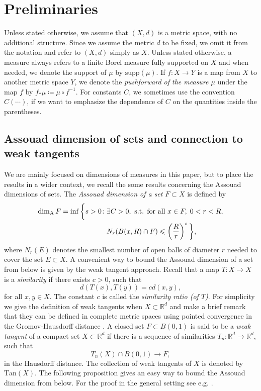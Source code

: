 \documentclass{PRM}
\newcommand{\field}[1]{\mathbb{#1}}
\newcommand{\R}{\field{R}}
\newcommand{\adim}{\dim_{\mathrm{A}}}
\theoremstyle{plain}
\theoremstyle{definition}
\theoremstyle{remark}
\begin{document}
\section{Preliminaries}\label{sec:prelim}
Unless stated otherwise, we assume that $(X,d)$ is a metric space, with no additional structure. Since we assume the metric $d$ to be fixed, we omit it from the notation and refer to $(X,d)$ simply as $X$. Unless stated otherwise, a measure always refers to a finite Borel measure fully supported on $X$ and when needed, we denote the support of $\mu$ by $\mathrm{supp}(\mu)$. If $f:X\to Y$ is a map from $X$ to another metric space $Y$, we denote the \emph{pushforward of the measure $\mu$} under the map $f$ by $f_*\mu\coloneqq\mu\circ f^{-1}$.  For constants $C$, we sometimes use the convention $C(\cdots)$, if we want to emphasize the dependence of $C$ on the quantities inside the parentheses.

\subsection{Assouad dimension of sets and connection to weak tangents}
We are mainly focused on dimensions of measures in this paper, but to place the results in a wider context, we recall the some results concerning the Assouad dimensions of sets. The \emph{Assouad dimension of a set} $F\subset X$ is defined by
\begin{align*}
    \adim F=\inf\bigg\{ s>0\colon& \exists C>0,\textnormal{ s.t. for all }x\in F,\; 0<r<R,\\
    &N_r(B(x,R)\cap F)\leq \left(\frac{R}{r}\right)^s\bigg\},
\end{align*}
where $N_r(E)$ denotes the smallest number of open balls of diameter $r$ needed to cover the set $E\subset X$.  A convenient way to bound the Assouad dimension of a set from below is given by the weak tangent approach. Recall that a map $T\colon X\to X$ is a \emph{similarity} if there exists $c>0$, such that
\begin{equation*}
    d(T(x),T(y))=c d(x,y),
\end{equation*}
for all $x,y\in X$. The constant $c$ is called the \emph{similarity ratio (of $T$)}.  For simplicity we give the definition of weak tangents when $X\subset \R^d$ and make a brief remark that they can be defined in complete metric spaces using pointed convergence in the Gromov-Hausdorff distance \cite{KL,MT}.  A closed set $F\subset B(0,1)$ is said to be a \emph{weak tangent} of a compact set $X\subset \R^d$ if there is a sequence of similarities $T_n\colon \R^d\to\R^d$, such that
\begin{equation*}
    T_n(X)\cap B(0,1)\to F,
\end{equation*}
in the Hausdorff distance. The collection of weak tangents of $X$ is denoted by $\mathrm{Tan}(X)$. The following proposition gives an easy way to bound the Assouad dimension from below. For the proof in the general setting see e.g. \cite[Proposition 6.1.5]{MT}.
\end{document}
